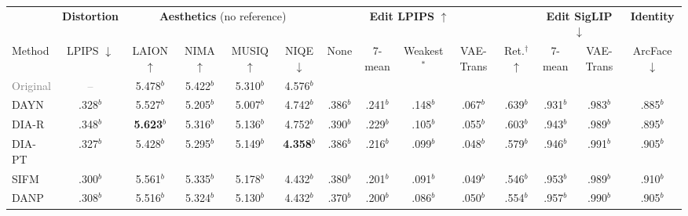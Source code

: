 \documentclass[10pt]{article}
\newcommand{\pend}[1]{#1}
\begin{document}
\begin{table}[h]
  \centering
  \footnotesize
  \setlength{\tabcolsep}{1.5pt}
  \begin{tabular}{l c cccc cccc c cc c}
    \toprule
    & \textbf{Distortion} & \multicolumn{4}{c}{\textbf{Aesthetics} (no reference)} & \multicolumn{4}{c}{\textbf{Edit LPIPS} $\uparrow$} & & \multicolumn{2}{c}{\textbf{Edit SigLIP} $\downarrow$} & \textbf{Identity} \\
    \cmidrule(lr){2-2} \cmidrule(lr){3-6} \cmidrule(lr){7-10} \cmidrule(lr){12-13} \cmidrule(l){14-14}
    Method & LPIPS $\downarrow$ & LAION $\uparrow$ & NIMA $\uparrow$ & MUSIQ $\uparrow$ & NIQE $\downarrow$ & None & 7-mean & Weakest$^{*}$ & VAE-Trans & Ret.$^{\dagger}$ $\uparrow$ & 7-mean & VAE-Trans & ArcFace $\downarrow$ \\
    \midrule
    \textcolor{gray}{Original} & \textcolor{gray}{--} & \pend{5.478}$^{b}$ & \pend{5.422}$^{b}$ & \pend{5.310}$^{b}$ & \pend{4.576}$^{b}$ & & & & & & & & \\
    \midrule
    DAYN & \pend{.328}$^{b}$ & \pend{5.527}$^{b}$ & \pend{5.205}$^{b}$ & \pend{5.007}$^{b}$ & \pend{4.742}$^{b}$ & \pend{.386}$^{b}$ & \pend{.241}$^{b}$ & \pend{.148}$^{b}$ & \pend{.067}$^{b}$ & \pend{.639}$^{b}$ & \pend{.931}$^{b}$ & \pend{.983}$^{b}$ & \pend{.885}$^{b}$ \\
    DIA-R & \pend{.348}$^{b}$ & \pend{\textbf{5.623}}$^{b}$ & \pend{5.316}$^{b}$ & \pend{5.136}$^{b}$ & \pend{4.752}$^{b}$ & \pend{.390}$^{b}$ & \pend{.229}$^{b}$ & \pend{.105}$^{b}$ & \pend{.055}$^{b}$ & \pend{.603}$^{b}$ & \pend{.943}$^{b}$ & \pend{.989}$^{b}$ & \pend{.895}$^{b}$ \\
    DIA-PT & \pend{.327}$^{b}$ & \pend{5.428}$^{b}$ & \pend{5.295}$^{b}$ & \pend{5.149}$^{b}$ & \pend{\textbf{4.358}}$^{b}$ & \pend{.386}$^{b}$ & \pend{.216}$^{b}$ & \pend{.099}$^{b}$ & \pend{.048}$^{b}$ & \pend{.579}$^{b}$ & \pend{.946}$^{b}$ & \pend{.991}$^{b}$ & \pend{.905}$^{b}$ \\
    SIFM & \pend{.300}$^{b}$ & \pend{5.561}$^{b}$ & \pend{5.335}$^{b}$ & \pend{5.178}$^{b}$ & \pend{4.432}$^{b}$ & \pend{.380}$^{b}$ & \pend{.201}$^{b}$ & \pend{.091}$^{b}$ & \pend{.049}$^{b}$ & \pend{.546}$^{b}$ & \pend{.953}$^{b}$ & \pend{.989}$^{b}$ & \pend{.910}$^{b}$ \\
    DANP & \pend{.308}$^{b}$ & \pend{5.516}$^{b}$ & \pend{5.324}$^{b}$ & \pend{5.130}$^{b}$ & \pend{4.432}$^{b}$ & \pend{.370}$^{b}$ & \pend{.200}$^{b}$ & \pend{.086}$^{b}$ & \pend{.050}$^{b}$ & \pend{.554}$^{b}$ & \pend{.957}$^{b}$ & \pend{.990}$^{b}$ & \pend{.905}$^{b}$ \\

\end{tabular}
\end{table}
\end{document}
